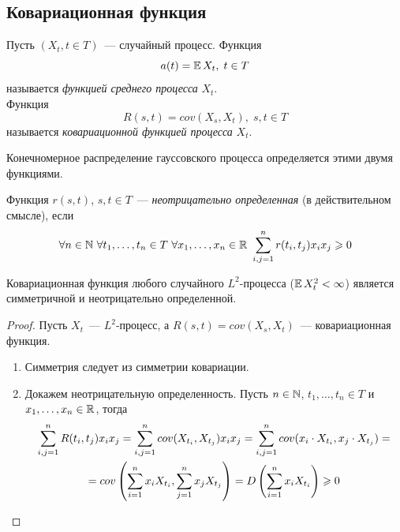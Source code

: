 \subsection{Ковариационная функция}

\begin{definition} Пусть $(X_t, t \in T)$~--- случайный процесс. Функция
    $$a(t) = \operatorname{\mathbb{E}} X_t, \; t\in T$$
    называется \textit{функцией среднего процесса} $X_t$. \\
    Функция
    $$R(s, t) = cov(X_s, X_t), \; s,t \in T$$
    называется \textit{ковариационной функцией процесса} $X_t$. 
\end{definition} 

\begin{note} 
    Конечномерное распределение гауссовского процесса определяется этими двумя функциями.
\end{note} 

\begin{definition} Функция $r(s, t)$, $s, t \in T$~--- \textit{неотрицательно определенная} (в действительном смысле), если 
    $$
    \forall n \in \mathbb{N} \ \forall t_1, \ldots, t_n \in T \ \forall x_1, \ldots, x_n \in \mathbb{R} \ \sum\limits_{i, j = 1}^n r(t_i, t_j) x_i x_j \geqslant 0
    $$
\end{definition}

\begin{statement}
    Ковариационная функция любого случайного $L^2$-процесса ($\operatorname{\mathbb{E}} X_t^2 < \infty$) является симметричной и неотрицательно определенной.
\end{statement}

\begin{proof}
    Пусть $X_t$~--- $L^2$-процесс, а $R(s, t) = cov(X_s, X_t)$~--- ковариационная функция.
    \begin{enumerate}
        \item Симметрия следует из симметрии ковариации.
        \item Докажем неотрицательную определенность. Пусть $n \in \mathbb{N}$, $t_1, \ldots, t_n \in T$ и $x_1, \ldots, x_n \in \mathbb{R}$, тогда
        \begin{multline*}
            \sum\limits_{i, j = 1}^n R(t_i, t_j) x_i x_j = \sum\limits_{i, j = 1}^n cov(X_{t_i}, X_{t_j}) x_ix_j = \sum\limits_{i, j = 1}^n cov(x_i \cdot X_{t_i}, x_j \cdot X_{t_j}) = \\
            = cov\left({\sum\limits_{i = 1}^n x_i X_{t_i}, \sum\limits_{j = 1}^n x_j X_{t_j}}\right) = D\left({\sum\limits_{i = 1}^n x_i X_{t_i}}\right) \geqslant 0
        \end{multline*}
    \end{enumerate} 
\end{proof}

